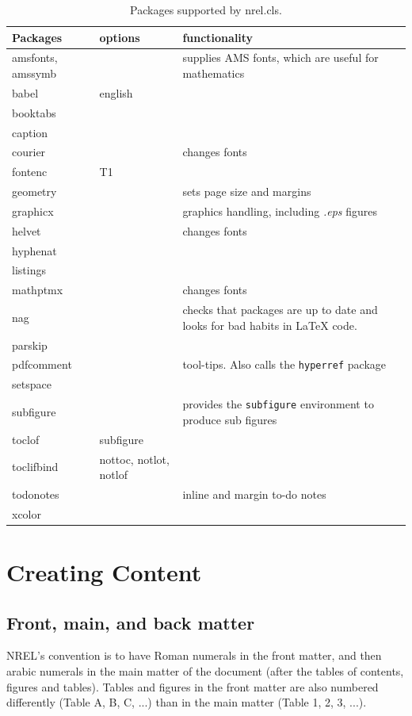\begin{table}[!h]
\centering
\caption[Packages supported by the nrel.cls class]{Packages supported by nrel.cls.}
\label{Tab:Packages}
\begin{tabular*}{\textwidth}{llp{}}
\toprule
Packages & options & functionality\\
\midrule
amsfonts, amssymb & & supplies AMS fonts, which are useful for mathematics \\
babel & english & \\
booktabs & & \\
caption & & \\
courier& & changes fonts \\
fontenc & T1 & \\
geometry & & sets page size and margins \\
graphicx & & graphics handling, including \emph{.eps} figures \\
helvet& & changes fonts \\
hyphenat & & \\
listings & & \\
mathptmx& & changes fonts \\
nag & & checks that packages are up to date and looks for bad habits in LaTeX code. \\
parskip & & \\
pdfcomment & & tool-tips. Also calls the \texttt{hyperref} package  \\
setspace & & \\
subfigure & & provides the \texttt{subfigure} environment to produce sub figures \\
toclof & subfigure & \\
toclifbind & nottoc, notlot, notlof & \\
todonotes & & inline and margin to-do notes \\
xcolor & & \\
\bottomrule
\end{tabular*}
\end{table}

\section{Creating Content}
\subsection{Front, main, and back matter}
NREL's convention is to have Roman numerals in the front matter, and then arabic numerals in the main matter of the document (after the tables of contents, figures and tables). Tables and figures in the front matter are also numbered differently (Table A, B, C, ...) than in the main matter (Table 1, 2, 3, ...).

